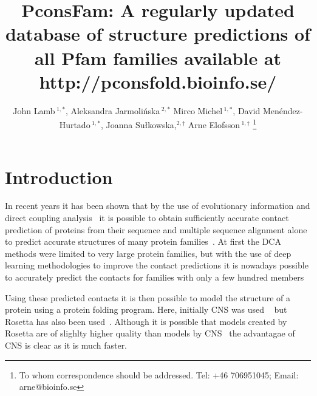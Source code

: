 \documentclass[a4,center,fleqn]{NAR}
\begin{document}
\title{PconsFam: A regularly updated database of structure predictions of all Pfam families available at http://pconsfold.bioinfo.se/}

\author{%
John Lamb\,$^{1,*}$,
Aleksandra Jarmolińska\,$^{2,*}$
Mirco Michel\,$^{1,*}$,
David Menéndez-Hurtado\,$^{1,*}$,
Joanna Sułkowska,$^{2,\dagger}$
Arne Elofsson\,$^{1,\dagger}$%
\footnote{To whom correspondence should be addressed.
Tel: +46 706951045; Email: arne@bioinfo.se}}

\address{%
$^{1}$Science for Life Laboratory and Department of Biochemistry and
biophysics, Stockholm Unviersity, Tomtebodav 23, 171 21 Solna, Sweden
and
$^{2}$ Interdisciplinary Laboratory of Biological Systems Modelling
ul. S. Banacha 2c, 02-097 Warsaw, Poland 
$^{*}$ contributed equally
$^{\dagger}$=contributing authors
}


\maketitle





\begin{abstract}


\end{abstract}

\section{Introduction}

In recent years it has been shown that by the use of evolutionary
information and direct coupling analysis~\cite{Weigt19116270} it is
possible to obtain sufficiently accurate contact prediction of
proteins from their sequence and multiple sequence alignment alone to
predict accurate structures of many protein
families~\cite{Sulkowska2012}. At first the DCA methods were limited
to very large protein families, but with the use of deep learning
methodologies to improve the contact predictions it is nowadays
possible to accurately predict the contacts for families with only a
few hundred members~\cite{Skwark25375897,Michel28535189,Wang28056090}

Using these predicted contacts it is then possible to model the
structure of a protein using a protein folding program. Here,
initially CNS was used ~\cite{Morcos22106262} but Rosetta has also
been used~\cite{Baker:1999}. Although it is possible that models
created by Rosetta are of slighlty higher quality than models by
CNS~\cite{Michel25161237} the advantagae of CNS is clear as it is much
faster. 
\end{document}
